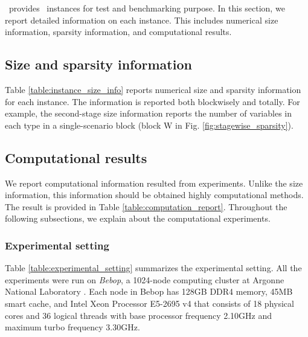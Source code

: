 %
%

\siplibtwo\ provides \smps\ instances for test and benchmarking  purpose. In this section, we report detailed information on each instance. This includes numerical size information, sparsity information, and computational results.

\subsection{Size and sparsity information}
Table \ref{table:instance_size_info} reports numerical size and sparsity information for each instance. The information is reported both blockwisely and totally. For example, the second-stage size information reports the number of variables in each type in a single-scenario block (block W in Fig. \ref{fig:stagewise_sparsity}).


\subsection{Computational results}
We report computational information resulted from experiments. Unlike the size information, this information should be obtained highly computational methods. The result is provided in Table \ref{table:computation_report}. Throughout the following subsections, we explain about the computational experiments.

\subsubsection{Experimental setting}
Table \ref{table:experimental_setting} summarizes the experimental setting. All the experiments were run on \textit{Bebop}, a 1024-node computing cluster at Argonne National Laboratory \cite{bebop}. Each node in Bebop has 128GB DDR4 memory, 45MB smart cache, and Intel Xeon Processor E5-2695 v4 that consists of 18 physical cores and 36 logical threads with base processor frequency 2.10GHz and maximum turbo frequency 3.30GHz. 


